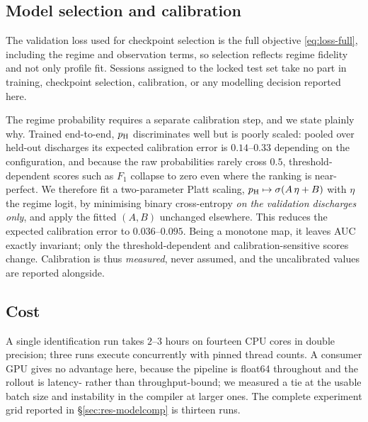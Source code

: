 \subsection{Model selection and calibration}
\label{sec:ident-select}

The validation loss used for checkpoint selection is the full objective
\eqref{eq:loss-full}, including the regime and observation terms, so
selection reflects regime fidelity and not only profile fit. Sessions
assigned to the locked test set take no part in training, checkpoint
selection, calibration, or any modelling decision reported here.

The regime probability requires a separate calibration step, and we state
plainly why. Trained end-to-end, $p_{\mathrm{H}}$ discriminates well but is poorly
scaled: pooled over held-out discharges its expected calibration error is
$0.14$--$0.33$ depending on the configuration, and because the raw
probabilities rarely cross $0.5$, threshold-dependent scores such as $F_1$
collapse to zero even where the ranking is near-perfect. We therefore fit a
two-parameter Platt scaling, $p_{\mathrm{H}} \mapsto \sigma(A\,\eta + B)$ with $\eta$
the regime logit, by minimising binary cross-entropy \emph{on the validation
discharges only}, and apply the fitted $(A,B)$ unchanged elsewhere. This
reduces the expected calibration error to $0.036$--$0.095$. Being a monotone
map, it leaves AUC exactly invariant; only the threshold-dependent and
calibration-sensitive scores change. Calibration is thus \emph{measured},
never assumed, and the uncalibrated values are reported alongside.

\subsection{Cost}
\label{sec:ident-cost}

A single identification run takes $2$--$3$ hours on fourteen CPU cores in
double precision; three runs execute concurrently with pinned thread counts.
A consumer GPU gives no advantage here, because the pipeline is float64
throughout and the rollout is latency- rather than throughput-bound; we
measured a tie at the usable batch size and instability in the compiler at
larger ones. The complete experiment grid reported in
\S\ref{sec:res-modelcomp} is thirteen runs.
